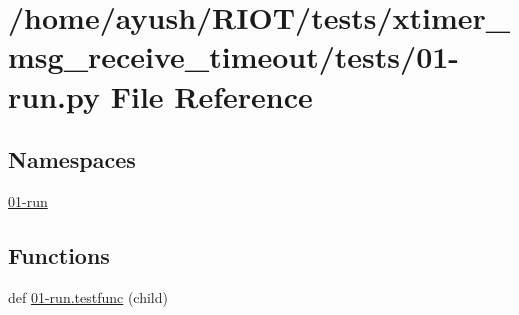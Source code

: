 \hypertarget{xtimer__msg__receive__timeout_2tests_201-run_8py}{}\section{/home/ayush/\+R\+I\+O\+T/tests/xtimer\+\_\+msg\+\_\+receive\+\_\+timeout/tests/01-\/run.py File Reference}
\label{xtimer__msg__receive__timeout_2tests_201-run_8py}
\subsection*{Namespaces}
\begin{DoxyCompactItemize}
\item 
 \hyperlink{namespace01-run}{01-\/run}
\end{DoxyCompactItemize}
\subsection*{Functions}
\begin{DoxyCompactItemize}
\item 
def \hyperlink{namespace01-run_aff983ffd4ab0e6bf8e7e58970e4a10bb}{01-\/run.\+testfunc} (child)
\end{DoxyCompactItemize}
